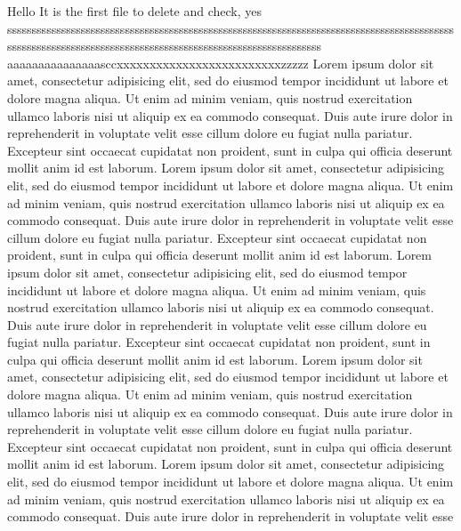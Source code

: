 Hello
It is the
first file
to delete and check, yes
\begin{equation}
    
\end{equation}
sssssssssssssssssssssssssssssssssssssssssssssssssssssssssssssssssssssssssssssssssssssssssssssssssssssssssssssssssssssssssssssssssssssssssssssssssssssssssss aaaaaaaaaaaaaaasccxxxxxxxxxxxxxxxxxxxxxxxxxzzzzz
       Lorem ipsum dolor sit amet, consectetur adipisicing elit, sed do eiusmod
       tempor incididunt ut labore et dolore magna aliqua. Ut enim ad minim veniam,
       quis nostrud exercitation ullamco laboris nisi ut aliquip ex ea commodo
       consequat. Duis aute irure dolor in reprehenderit in voluptate velit esse
       cillum dolore eu fugiat nulla pariatur. Excepteur sint occaecat cupidatat non
proident, sunt in culpa qui officia deserunt mollit anim id est laborum.
Lorem ipsum dolor sit amet, consectetur adipisicing elit, sed do eiusmod
tempor incididunt ut labore et dolore magna aliqua. Ut enim ad minim veniam,
       quis nostrud exercitation ullamco laboris nisi ut aliquip ex ea commodo
       consequat. Duis aute irure dolor in reprehenderit in voluptate velit esse
       cillum dolore eu fugiat nulla pariatur. Excepteur sint occaecat cupidatat non
       proident, sunt in culpa qui officia deserunt mollit anim id est laborum.
       Lorem ipsum dolor sit amet, consectetur adipisicing elit, sed do eiusmod
       tempor incididunt ut labore et dolore magna aliqua. Ut enim ad minim veniam,
       quis nostrud exercitation ullamco laboris nisi ut aliquip ex ea commodo
       consequat. Duis aute irure dolor in reprehenderit in voluptate velit esse
       cillum dolore eu fugiat nulla pariatur. Excepteur sint occaecat cupidatat non
       proident, sunt in culpa qui officia deserunt mollit anim id est laborum.
       Lorem ipsum dolor sit amet, consectetur adipisicing elit, sed do eiusmod
       tempor incididunt ut labore et dolore magna aliqua. Ut enim ad minim veniam,
       quis nostrud exercitation ullamco laboris nisi ut aliquip ex ea commodo
       consequat. Duis aute irure dolor in reprehenderit in voluptate velit esse
       cillum dolore eu fugiat nulla pariatur. Excepteur sint occaecat cupidatat non
       proident, sunt in culpa qui officia deserunt mollit anim id est laborum.
       Lorem ipsum dolor sit amet, consectetur adipisicing elit, sed do eiusmod
       tempor incididunt ut labore et dolore magna aliqua. Ut enim ad minim veniam,
       quis nostrud exercitation ullamco laboris nisi ut aliquip ex ea commodo
       consequat. Duis aute irure dolor in reprehenderit in voluptate velit esse
